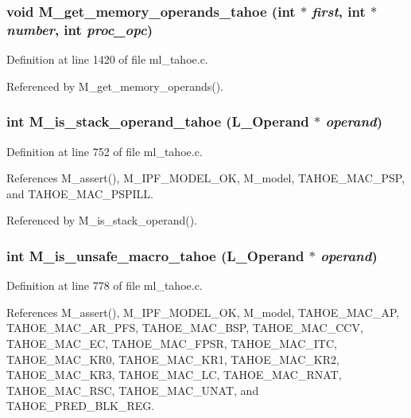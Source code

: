 \subsubsection{\setlength{\rightskip}{0pt plus 5cm}void M\_\-get\_\-memory\_\-operands\_\-tahoe (int $\ast$ {\em first}, int $\ast$ {\em number}, int {\em proc\_\-opc})}\label{m__tahoe_8h_a388057865d300904a57adab6cb5b0d0}




Definition at line 1420 of file ml\_\-tahoe.c.

Referenced by M\_\-get\_\-memory\_\-operands().
\subsubsection{\setlength{\rightskip}{0pt plus 5cm}int M\_\-is\_\-stack\_\-operand\_\-tahoe (L\_\-Operand $\ast$ {\em operand})}\label{m__tahoe_8h_27d9dadcccb34475148be713176f24d5}




Definition at line 752 of file ml\_\-tahoe.c.

References M\_\-assert(), M\_\-IPF\_\-MODEL\_\-OK, M\_\-model, TAHOE\_\-MAC\_\-PSP, and TAHOE\_\-MAC\_\-PSPILL.

Referenced by M\_\-is\_\-stack\_\-operand().
\subsubsection{\setlength{\rightskip}{0pt plus 5cm}int M\_\-is\_\-unsafe\_\-macro\_\-tahoe (L\_\-Operand $\ast$ {\em operand})}\label{m__tahoe_8h_66fc8d4d31ca14690c83b1223b99dc52}




Definition at line 778 of file ml\_\-tahoe.c.

References M\_\-assert(), M\_\-IPF\_\-MODEL\_\-OK, M\_\-model, TAHOE\_\-MAC\_\-AP, TAHOE\_\-MAC\_\-AR\_\-PFS, TAHOE\_\-MAC\_\-BSP, TAHOE\_\-MAC\_\-CCV, TAHOE\_\-MAC\_\-EC, TAHOE\_\-MAC\_\-FPSR, TAHOE\_\-MAC\_\-ITC, TAHOE\_\-MAC\_\-KR0, TAHOE\_\-MAC\_\-KR1, TAHOE\_\-MAC\_\-KR2, TAHOE\_\-MAC\_\-KR3, TAHOE\_\-MAC\_\-LC, TAHOE\_\-MAC\_\-RNAT, TAHOE\_\-MAC\_\-RSC, TAHOE\_\-MAC\_\-UNAT, and TAHOE\_\-PRED\_\-BLK\_\-REG.

